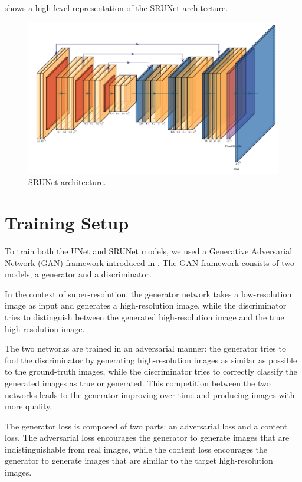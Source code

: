  shows a high-level representation of the SRUNet architecture.

\begin{figure}[ht]
\centering
\includegraphics[width=1.0\textwidth]{static/srunet_architecture.png}
\caption{SRUNet architecture.}
\label{fig:srunet}
\end{figure}

\section{Training Setup}
\label{sec:training-setup}

To train both the UNet and SRUNet models, we used a Generative Adversarial Network (GAN) framework introduced in \cite{goodfellow2020generative}. The GAN framework consists of two models, a generator and a discriminator.

In the context of super-resolution, the generator network takes a low-resolution image as input and generates a high-resolution image, while the discriminator tries to distinguish between the generated high-resolution image and the true high-resolution image.

The two networks are trained in an adversarial manner: the generator tries to fool the discriminator by generating high-resolution images as similar as possible to the ground-truth images, while the discriminator tries to correctly classify the generated images as true or generated. This competition between the two networks leads to the generator improving over time and producing images with more quality.

The generator loss is composed of two parts: an adversarial loss and a content loss. The adversarial loss encourages the generator to generate images that are indistinguishable from real images, while the content loss encourages the generator to generate images that are similar to the target high-resolution images.

